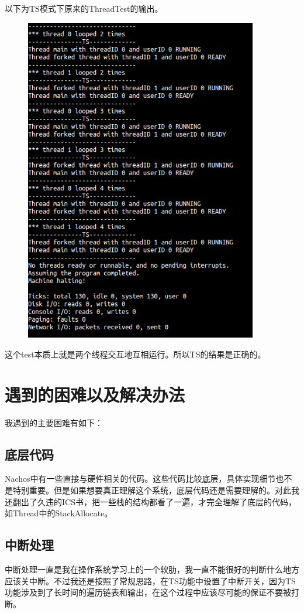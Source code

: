 \documentclass{ctexart}
\begin{document}
以下为TS模式下原来的ThreadTest的输出。
\begin{figure}[h]
 \centering
\includegraphics[width=4in]{ex3.png}
\end{figure}

这个test本质上就是两个线程交互地互相运行。所以TS的结果是正确的。
\section{遇到的困难以及解决办法}
我遇到的主要困难有如下：
\subsection*{底层代码}
Nachos中有一些直接与硬件相关的代码。这些代码比较底层，具体实现细节也不是特别重要。但是如果想要真正理解这个系统，底层代码还是需要理解的。对此我还翻出了久违的ICS书，把一些栈的结构都看了一遍，才完全理解了底层的代码，如Thread中的StackAllocate。
\subsection*{中断处理}
中断处理一直是我在操作系统学习上的一个软肋，我一直不能很好的判断什么地方应该关中断。不过我还是按照了常规思路，在TS功能中设置了中断开关，因为TS功能涉及到了长时间的遍历链表和输出，在这个过程中应该尽可能的保证不要被打断。
\end{document}
